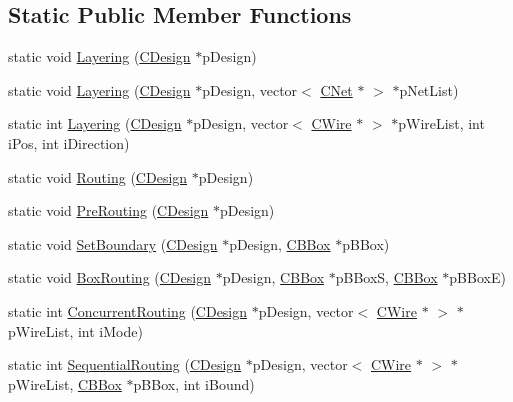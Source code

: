 \subsection*{Static Public Member Functions}
\begin{DoxyCompactItemize}
\item 
static void \mbox{\hyperlink{classCGRouter_af52c3a9802eff8e543e13a643e5de83a}{Layering}} (\mbox{\hyperlink{classCDesign}{C\+Design}} $\ast$p\+Design)
\item 
static void \mbox{\hyperlink{classCGRouter_ab3aa19892e106aedd7bdceb6ed966200}{Layering}} (\mbox{\hyperlink{classCDesign}{C\+Design}} $\ast$p\+Design, vector$<$ \mbox{\hyperlink{classCNet}{C\+Net}} $\ast$ $>$ $\ast$p\+Net\+List)
\item 
static int \mbox{\hyperlink{classCGRouter_afc852a0443d502841940332116812f54}{Layering}} (\mbox{\hyperlink{classCDesign}{C\+Design}} $\ast$p\+Design, vector$<$ \mbox{\hyperlink{classCWire}{C\+Wire}} $\ast$ $>$ $\ast$p\+Wire\+List, int i\+Pos, int i\+Direction)
\item 
static void \mbox{\hyperlink{classCGRouter_a4c455bc1400005226fcb3a04639c79c7}{Routing}} (\mbox{\hyperlink{classCDesign}{C\+Design}} $\ast$p\+Design)
\item 
static void \mbox{\hyperlink{classCGRouter_aef04c6783171f5e9582e7d24b8966a07}{Pre\+Routing}} (\mbox{\hyperlink{classCDesign}{C\+Design}} $\ast$p\+Design)
\item 
static void \mbox{\hyperlink{classCGRouter_a831631d047b63b52b1c2a50182abaad6}{Set\+Boundary}} (\mbox{\hyperlink{classCDesign}{C\+Design}} $\ast$p\+Design, \mbox{\hyperlink{classCBBox}{C\+B\+Box}} $\ast$p\+B\+Box)
\item 
static void \mbox{\hyperlink{classCGRouter_a65501a12c10da7894dc0e96ce5c449c0}{Box\+Routing}} (\mbox{\hyperlink{classCDesign}{C\+Design}} $\ast$p\+Design, \mbox{\hyperlink{classCBBox}{C\+B\+Box}} $\ast$p\+B\+BoxS, \mbox{\hyperlink{classCBBox}{C\+B\+Box}} $\ast$p\+B\+BoxE)
\item 
static int \mbox{\hyperlink{classCGRouter_a5c1d10e81773579ad3acbdaf5965725e}{Concurrent\+Routing}} (\mbox{\hyperlink{classCDesign}{C\+Design}} $\ast$p\+Design, vector$<$ \mbox{\hyperlink{classCWire}{C\+Wire}} $\ast$ $>$ $\ast$p\+Wire\+List, int i\+Mode)
\item 
static int \mbox{\hyperlink{classCGRouter_a2d4926771b5862045dd154782f478809}{Sequential\+Routing}} (\mbox{\hyperlink{classCDesign}{C\+Design}} $\ast$p\+Design, vector$<$ \mbox{\hyperlink{classCWire}{C\+Wire}} $\ast$ $>$ $\ast$p\+Wire\+List, \mbox{\hyperlink{classCBBox}{C\+B\+Box}} $\ast$p\+B\+Box, int i\+Bound)

\end{DoxyCompactItemize}
